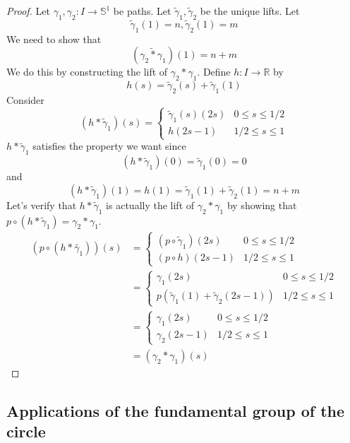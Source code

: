 \begin{proof}
    Let \( \gamma_1, \gamma_2: I \to \mathbb{S}^1 \) be paths.
    Let \( \tilde{\gamma}_1, \tilde{\gamma}_2 \) be
    the unique lifts. Let \[ \tilde{\gamma}_1(1) = n, \tilde{\gamma}_2(1) = m \]
    We need to show that \[ (\widetilde{\gamma_2 * \gamma_1})(1) = n + m \]
    We do this by constructing the lift of \( \gamma_2 * \gamma_1 \).
    Define \( h: I \to \mathbb{R} \) by
    \[
      h(s) = \tilde{\gamma}_2(s) + \tilde{\gamma}_1(1)
    \]
    Consider
    \[
      (h * \tilde{\gamma}_1)(s) = \begin{cases}
        \tilde{\gamma}_1(s) (2s) & 0 \le s \le 1/2 \\
        h(2s - 1) & 1/2 \le s \le 1
      \end{cases}
    \]
    \( h * \tilde{\gamma}_1 \) satisfies the
    property we want since
    \[
      (h * \tilde{\gamma}_1)(0) = \tilde{\gamma}_1(0) = 0
    \]
    and
    \[
      (h * \tilde{\gamma}_1)(1) = h(1)
      = \tilde{\gamma}_1(1) + \tilde{\gamma}_2(1)
      = n + m
    \]
    Let's verify that \( h * \tilde{\gamma}_1 \)
    is actually the lift of \( \gamma_2 * \gamma_1 \)
    by showing that
    \(
      p \circ (h * \tilde{\gamma}_1) = \gamma_2 * \gamma_1
    \).
    \begin{align*}
      (p \circ (h * \tilde{\gamma_1}))(s)
        &= \begin{cases}
          (p \circ \tilde{\gamma}_1) (2s) & 0 \le s \le 1/2 \\
          (p \circ h) (2s - 1) & 1/2 \le s \le 1
        \end{cases} \\
        &= \begin{cases}
          \gamma_1(2s) & 0 \le s \le 1/2 \\
          p\left(\tilde{\gamma}_1(1) + \tilde{\gamma}_2(2s - 1)\right) & 1/2 \le s \le 1
        \end{cases} \\
        &= \begin{cases}
          \gamma_1(2s)      & 0 \le s \le 1/2 \\
          \gamma_2(2s - 1)  & 1/2 \le s \le 1
        \end{cases} \\
        &= (\gamma_2 * \gamma_1)(s)
    \end{align*}
\end{proof}


\subsection{Applications of the fundamental group of the circle}

